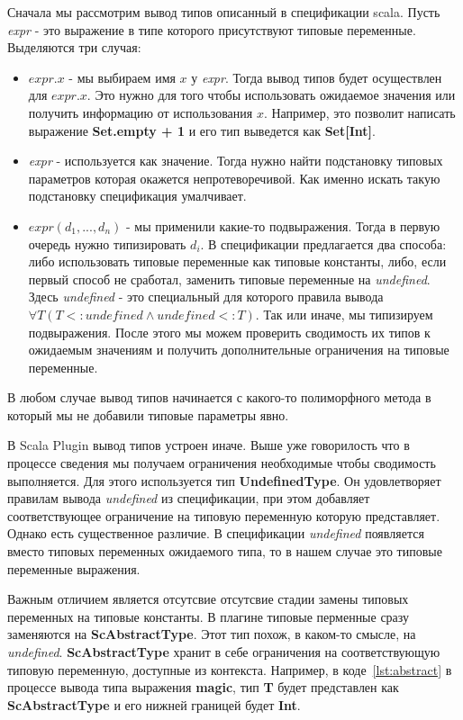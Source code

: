 Сначала мы рассмотрим вывод типов описанный в спецификации scala.
Пусть \textit{expr} - это выражение в типе которого присутствуют типовые переменные.
Выделяются три случая:
\begin{itemize}
  \item $\mathit{expr}.x$ - мы выбираем имя $x$ у \textit{expr}.
  Тогда вывод типов будет осуществлен для $\mathit{expr}.x$.
  Это нужно для того чтобы использовать ожидаемое значения или получить
  информацию от использования $x$.
  Например, это позволит написать выражение \textbf{Set.empty + 1} и его тип
  выведется как \textbf{Set[Int]}.
  \item \textit{expr} - используется как значение.
  Тогда нужно найти подстановку типовых параметров которая окажется
  непротеворечивой.
  Как именно искать такую подстановку спецификация умалчивает.
  \item $\mathit{expr}(d_1, ..., d_n)$ - мы применили какие-то подвыражения.
  Тогда в первую очередь нужно типизировать $d_i$.
  В спецификации предлагается два способа:
  либо использовать типовые переменные как типовые константы,
  либо, если первый способ не сработал, заменить типовые переменные на \textit{undefined}.
  Здесь \textit{undefined} - это специальный для которого правила вывода
  $\forall T (T <: \mathit{undefined} \land \mathit{undefined} <: T)$.
  Так или иначе, мы типизируем подвыражения.
  После этого мы можем проверить сводимость их типов к ожидаемым значениям и
  получить дополнительные ограничения на типовые переменные.
\end{itemize}

В любом случае вывод типов начинается с какого-то полиморфного метода в который
мы не добавили типовые параметры явно.

В Scala Plugin вывод типов устроен иначе.
Выше уже говорилость что в процессе сведения мы получаем ограничения необходимые
чтобы сводимость выполняется.
Для этого используется тип \textbf{UndefinedType}.
Он удовлетворяет правилам вывода \textit{undefined} из спецификации, при этом
добавляет соответствующее ограничение на типовую переменную которую представляет.
Однако есть существенное различие.
В спецификации \textit{undefined} появляется вместо типовых переменных
ожидаемого типа, то в нашем случае это типовые переменные выражения.

Важным отличием является отсутсвие отсутсвие стадии замены типовых переменных на
типовые константы. В плагине типовые перменные сразу заменяются на
\textbf{ScAbstractType}.
Этот тип похож, в каком-то смысле, на \textit{undefined}.
\textbf{ScAbstractType} хранит в себе ограничения на соответствующую типовую
переменную, доступные из контекста.
Например, в коде~\ref{lst:abstract} в процессе вывода типа выражения
\textbf{magic}, тип \textbf{T} будет представлен как \textbf{ScAbstractType} и
его нижней границей будет \textbf{Int}.

